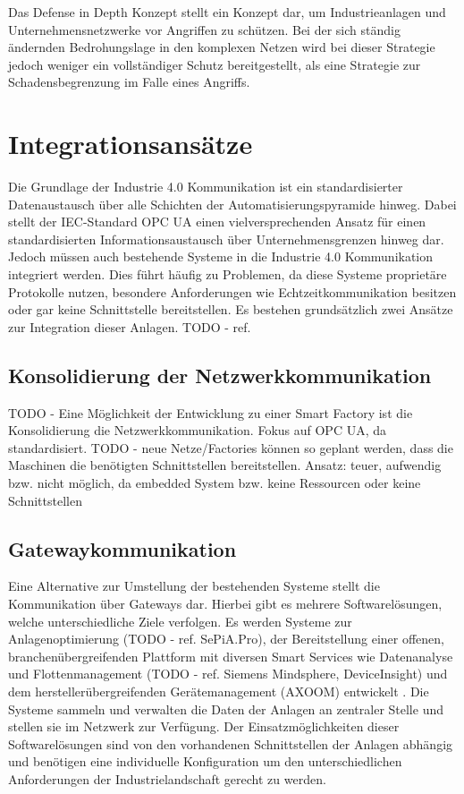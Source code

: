 \clearpage

Das Defense in Depth Konzept stellt ein Konzept dar, um Industrieanlagen und Unternehmensnetzwerke vor Angriffen zu schützen. Bei der sich ständig ändernden Bedrohungslage in den komplexen Netzen wird bei dieser Strategie jedoch weniger ein vollständiger Schutz bereitgestellt, als eine Strategie zur Schadensbegrenzung im Falle eines Angriffs.

\section{Integrationsansätze}
Die Grundlage der Industrie 4.0 Kommunikation ist ein standardisierter Datenaustausch über alle Schichten der Automatisierungspyramide hinweg. Dabei stellt der \ac{IEC}-Standard \ac{OPC UA} einen vielversprechenden Ansatz für einen standardisierten Informationsaustausch über Unternehmensgrenzen hinweg dar. Jedoch müssen auch bestehende Systeme in die Industrie 4.0 Kommunikation integriert werden. Dies führt häufig zu Problemen, da diese Systeme proprietäre Protokolle nutzen, besondere Anforderungen wie Echtzeitkommunikation besitzen oder gar keine Schnittstelle bereitstellen. Es bestehen grundsätzlich zwei Ansätze zur Integration dieser Anlagen. TODO - ref.

\subsection{Konsolidierung der Netzwerkkommunikation}
TODO - Eine Möglichkeit der Entwicklung zu einer Smart Factory ist die Konsolidierung die Netzwerkkommunikation. Fokus auf OPC UA, da standardisiert.
TODO - neue Netze/Factories können so geplant werden, dass die Maschinen die benötigten Schnittstellen bereitstellen.
Ansatz: teuer, aufwendig bzw. nicht möglich, da embedded System bzw. keine Ressourcen oder keine Schnittstellen

\subsection{Gatewaykommunikation}
Eine Alternative zur Umstellung der bestehenden Systeme stellt die Kommunikation über Gateways dar. Hierbei gibt es mehrere Softwarelösungen, welche unterschiedliche Ziele verfolgen. Es werden Systeme zur Anlagenoptimierung (TODO - ref. SePiA.Pro), der Bereitstellung einer offenen, branchenübergreifenden Plattform mit diversen Smart Services wie Datenanalyse und Flottenmanagement (TODO - ref. Siemens Mindsphere, DeviceInsight) und dem herstellerübergreifenden Gerätemanagement (AXOOM) entwickelt \cite{acatec2016}. Die Systeme sammeln und verwalten die Daten der Anlagen an zentraler Stelle und stellen sie im Netzwerk zur Verfügung. Der Einsatzmöglichkeiten dieser Softwarelösungen sind von den vorhandenen Schnittstellen der Anlagen abhängig und benötigen eine individuelle Konfiguration um den unterschiedlichen Anforderungen der Industrielandschaft gerecht zu werden.

